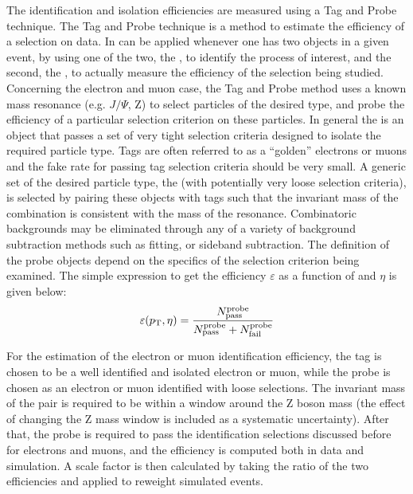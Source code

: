 The identification and isolation efficiencies are measured using a Tag and Probe technique. 
The Tag and Probe technique is a method to estimate the efficiency of a selection on data. In can be applied whenever one has two objects in a given event, by using one of the two, the \tg{}, to identify the process of interest, and the second, the \probe{}, to actually measure the efficiency of the selection being studied.
Concerning the electron and muon case, the Tag and Probe method uses a known mass resonance (e.g. $J/\Psi$, Z) to select particles of the desired type, and probe the efficiency of a particular selection criterion on these particles. In general the \tg{} is an object that passes a set of very tight selection criteria designed to isolate the required particle type. Tags are often referred to as a ``golden'' electrons or muons and the fake rate for passing tag selection criteria should be very small. A generic set of the desired particle type, the \probe{} (with potentially very loose selection criteria), is selected by pairing these objects with tags such that the invariant mass of the combination is consistent with the mass of the resonance. Combinatoric backgrounds may be eliminated through any of a variety of background subtraction methods such as fitting, or sideband subtraction. The definition of the probe objects depend on the specifics of the selection criterion being examined. The simple expression to get the efficiency $\varepsilon$ as a function of \pt and $\eta$ is given below:
\begin{equation}\label{eq:tagprobe}
\varepsilon(p_\mathrm{T},\eta) = \frac{ N^\mathrm{probe}_\mathrm{pass}}{N^\mathrm{probe}_\mathrm{pass} + N^\mathrm{probe}_\mathrm{fail}}
\end{equation}

For the estimation of the electron or muon identification efficiency, the tag is chosen to be a well identified and isolated electron or muon, while the probe is chosen as an electron or muon identified with loose selections. The invariant mass of the \tp pair is required to be within a window around the Z boson mass (the effect of changing the Z mass window is included as a systematic uncertainty). After that, the probe is required to pass the identification selections discussed before for electrons and muons, and the efficiency is computed both in data and simulation. A scale factor is then calculated by taking the ratio of the two efficiencies and applied to reweight simulated events.


